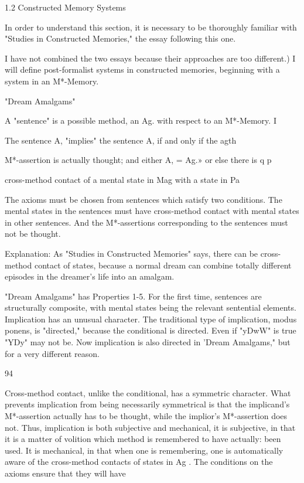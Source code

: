 \documentclass[10pt,twoside]{memoir}
\begin{document}
\begin{enumerate}
{{{{{{{{{{{{{{{{{1.2 Constructed Memory Systems 

In order to understand this section, it is necessary to be thoroughly 
familiar with "Studies in Constructed Memories," the essay following this 
one. {I have not combined the two essays because their approaches are too 
different.) I will define post-formalist systems in constructed memories, 
beginning with a system in an M*-Memory. 


"Dream Amalgams" 


A "sentence" is a possible method, an Ag. with respect to an M*-Memory. 
I 


The sentence A, "implies" the sentence A, if and only if the agth 


M*-assertion is actually thought; and either A, = Ag.» or else there is 
q p 


cross-method contact of a mental state in Mag with a state in Pa 

The axioms must be chosen from sentences which satisfy two conditions. 
The mental states in the sentences must have cross-method contact 
with mental states in other sentences. And the M*-assertions 
corresponding to the sentences must not be thought. 

Explanation: As "Studies in Constructed Memories" says, there can be 
cross-method contact of states, because a normal dream can 
combine totally different episodes in the dreamer's life into an 
amalgam. 

"Dream Amalgams" has Properties 1-5. For the first time, sentences are 
structurally composite, with mental states being the relevant sentential 
elements. Implication has an unusual character. The traditional type of 
implication, modus ponens, is "directed," because the conditional is 
directed. Even if "yDwW" is true "YDy" may not be. Now implication is also 
directed in 'Dream Amalgams," but for a very different reason. 


94 


Cross-method contact, unlike the conditional, has a symmetric character. 
What prevents implication from being necessarily symmetrical is that the 
implicand's M*-assertion actually has to be thought, while the implior's 
M*-assertion does not. Thus, implication is both subjective and mechanical, 
it is subjective, in that it is a matter of volition which method is remembered 
to have actually: been used. It is mechanical, in that when one is 
remembering, one is automatically aware of the cross-method contacts of 
states in Ag . The conditions on the axioms ensure that they will have 


}}}}}}}}}}}}}}}}}}
\end{enumerate}
\end{document}
